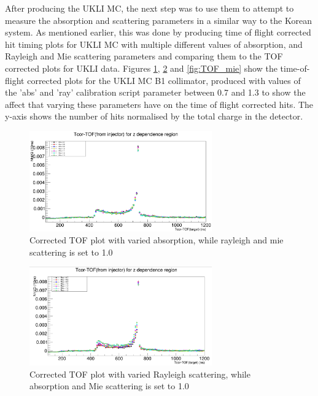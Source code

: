 After producing the UKLI MC, the next step was to use them to attempt to measure the absorption and scattering parameters in a similar way to the Korean system. As mentioned earlier, this was done by producing time of flight corrected hit timing plots for UKLI MC with multiple different values of absorption, and Rayleigh and Mie scattering parameters and comparing them to the TOF corrected plots for UKLI data. Figures \ref{fig:TOF_abs}, \ref{fig:TOF_ray} and \ref{fig:TOF_mie} show the time-of-flight corrected plots for the UKLI MC B1 collimator, produced with values of the 'abs' and 'ray' calibration script parameter between 0.7 and 1.3 to show the affect that varying these parameters have on the time of flight corrected hits. The y-axis shows the number of hits normalised by the total charge in the detector.

\begin{figure}
    \centering
    \includegraphics[width=0.7\textwidth]{Figures/TOF_abs.PNG}
    \caption{Corrected TOF plot with varied absorption, while rayleigh and mie scattering is set to 1.0}
    \label{fig:TOF_abs}
\end{figure}

\begin{figure}
    \centering
    \includegraphics[width=0.7\textwidth]{Figures/TOF_ray.PNG}
    \caption{Corrected TOF plot with varied Rayleigh scattering, while absorption and Mie scattering is set to 1.0}
    \label{fig:TOF_ray}
\end{figure}

